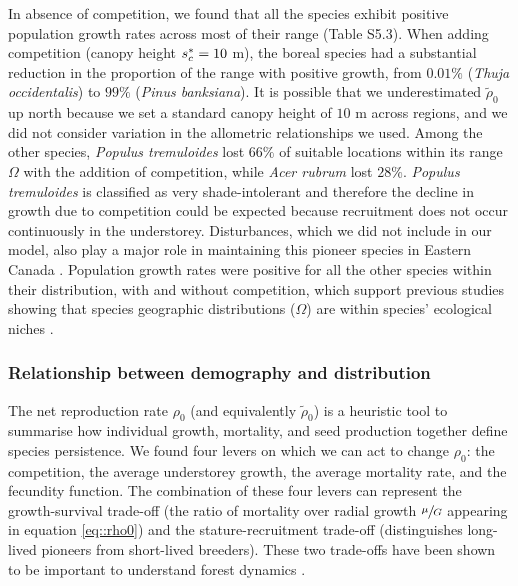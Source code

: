 In absence of competition, we found that all the species exhibit positive population growth rates across most of their range (Table S5.3). When adding competition (canopy height $ {s}^{*}_c = 10 $ m), the boreal species had a substantial reduction in the proportion of the range with positive growth, from $ 0.01 \% $ (\textit{Thuja occidentalis}) to $ 99 \% $ (\textit{Pinus banksiana}). It is possible that we underestimated $ \tilde \rho_0 $ up north because we set a standard canopy height of $ 10 $ m across regions, and we did not consider variation in the allometric relationships we used. Among the other species, \textit{Populus tremuloides} lost $ 66 \% $ of suitable locations within its range $ \Omega $ with the addition of competition, while \textit{Acer rubrum} lost $ 28 \% $. \textit{Populus tremuloides} is classified as very shade-intolerant \citep{Burns1990a} and therefore the decline in growth due to competition could be expected because recruitment does not occur continuously in the understorey. Disturbances, which we did not include in our model, also play a major role in maintaining this pioneer species in Eastern Canada \citep{Nlungu-Kweta2017}. Population growth rates were positive for all the other species within their distribution, with and without competition, which support previous studies showing that species geographic distributions ($ \Omega $) are within species' ecological niches \citep{Lee-Yaw2016, Csergo2017}.

\subsubsection{Relationship between demography and distribution}
The net reproduction rate $ \rho_0 $ (and equivalently $ \tilde \rho_0 $) is a heuristic tool to summarise how individual growth, mortality, and seed production together define species persistence. We found four levers on which we can act to change $ \rho_0 $: the competition, the average understorey growth, the average mortality rate, and the fecundity function. The combination of these four levers can represent the growth-survival trade-off (\eg the ratio of mortality over radial growth $ \sfrac{\mu}{G} $ appearing in equation \eqref{eq::rho0}) and the stature-recruitment trade-off (distinguishes long-lived pioneers from short-lived breeders). These two trade-offs have been shown to be important to understand forest dynamics \citep[for tropical forest]{Ruger2020}. \\

